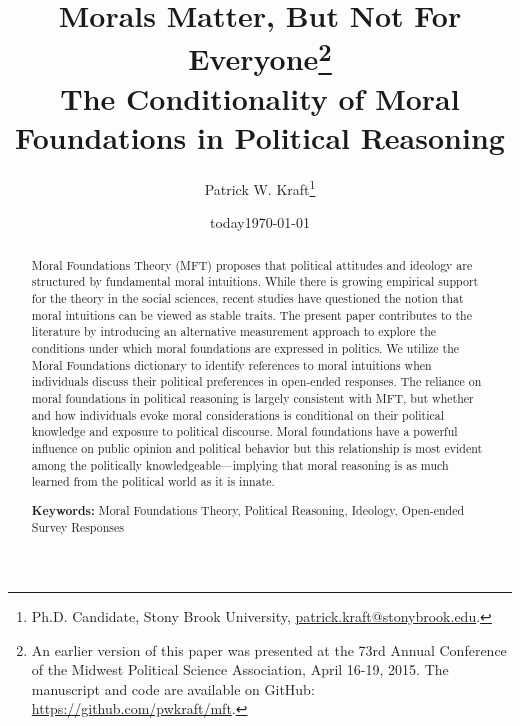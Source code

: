 \documentclass[12pt]{article}
\author{Patrick W. Kraft\footnote{Ph.D. Candidate, Stony Brook University, \href{mailto:patrick.kraft@stonybrook.edu}{patrick.kraft@stonybrook.edu}.
}}
\date{today}
\title{Morals Matter, But Not For Everyone\footnote{An earlier version of this paper was presented at the 73rd Annual Conference of the Midwest Political Science Association, April 16-19, 2015. The manuscript and code are available on GitHub: \url{https://github.com/pwkraft/mft}.}\\
\large{The Conditionality of Moral Foundations in Political Reasoning}}
\date{\today}
\begin{document}
\maketitle
\doublespacing

\begin{abstract}\singlespacing
Moral Foundations Theory (MFT) proposes that political attitudes and ideology are structured by fundamental moral intuitions. While there is growing empirical support for the theory in the social sciences, recent studies have questioned the notion that moral intuitions can be viewed as stable traits. The present paper contributes to the literature by introducing an alternative measurement approach to explore the conditions under which moral foundations are expressed in politics. We utilize the Moral Foundations dictionary to identify references to moral intuitions when individuals discuss their political preferences in open-ended responses. The reliance on moral foundations in political reasoning is largely consistent with MFT, but whether and how individuals evoke moral considerations is conditional on their political knowledge and exposure to political discourse. Moral foundations have a powerful influence on public opinion and political behavior but this relationship is most evident among the politically knowledgeable---implying that moral reasoning is as much learned from the political world as it is innate.

\vspace{\baselineskip}
\noindent \textbf{Keywords:} Moral Foundations Theory, Political Reasoning, Ideology, Open-ended Survey Responses
\end{abstract}
\newpage

\end{document}
